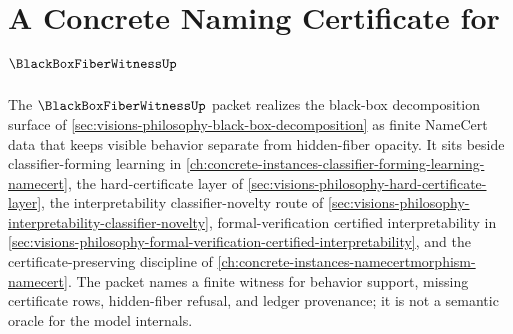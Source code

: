 \chapter{A Concrete Naming Certificate for $\BlackBoxFiberWitnessUp$}
\label{ch:concrete-instances-black-box-fiber-witness-namecert}

The $\BlackBoxFiberWitnessUp$ packet realizes the black-box decomposition surface of \autoref{sec:visions-philosophy-black-box-decomposition} as finite NameCert data that keeps visible behavior separate from hidden-fiber opacity. It sits beside classifier-forming learning in \autoref{ch:concrete-instances-classifier-forming-learning-namecert}, the hard-certificate layer of \autoref{sec:visions-philosophy-hard-certificate-layer}, the interpretability classifier-novelty route of \autoref{sec:visions-philosophy-interpretability-classifier-novelty}, formal-verification certified interpretability in \autoref{sec:visions-philosophy-formal-verification-certified-interpretability}, and the certificate-preserving discipline of \autoref{ch:concrete-instances-namecertmorphism-namecert}. The packet names a finite witness for behavior support, missing certificate rows, hidden-fiber refusal, and ledger provenance; it is not a semantic oracle for the model internals.



